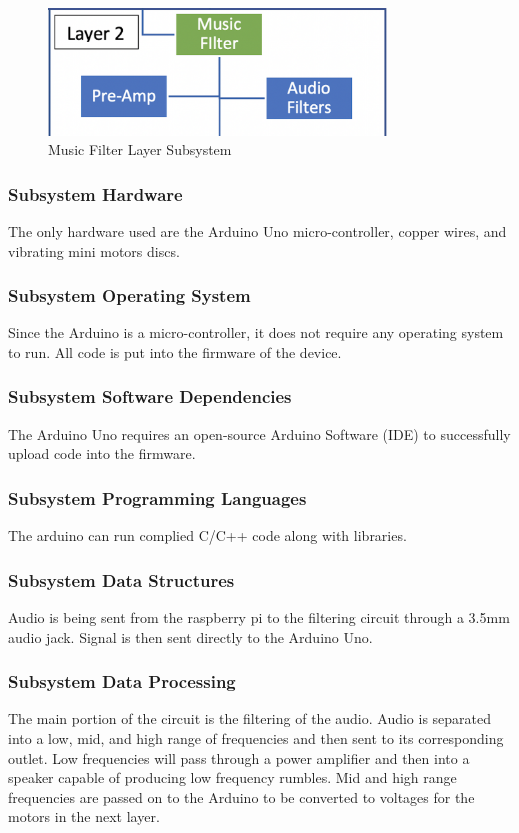 \begin{figure}[h!]
	\centering
 	\includegraphics[width=0.8\textwidth]{images/subsystem2}
 \caption{Music Filter Layer Subsystem}
\end{figure}

\subsubsection{Subsystem Hardware}
The only hardware used are the Arduino Uno micro-controller, copper wires, and vibrating mini motors discs.

\subsubsection{Subsystem Operating System}
Since the Arduino is a micro-controller, it does not require any operating system to run. All code is put into the firmware of the device.

\subsubsection{Subsystem Software Dependencies}
The Arduino Uno requires an open-source Arduino Software (IDE) to successfully upload code into the firmware.

\subsubsection{Subsystem Programming Languages}
The arduino can run complied C/C++ code along with libraries.

\subsubsection{Subsystem Data Structures}
Audio is being sent from the raspberry pi to the filtering circuit through a 3.5mm audio jack. Signal is then sent directly to the Arduino Uno.

\subsubsection{Subsystem Data Processing}
The main portion of the circuit is the filtering of the audio. Audio is separated into a low, mid, and high range of frequencies and then sent to its corresponding outlet. Low frequencies will pass through a power amplifier and then into a speaker capable of producing low frequency rumbles. Mid and high range frequencies are passed on to the Arduino to be converted to voltages for the motors in the next layer. 
